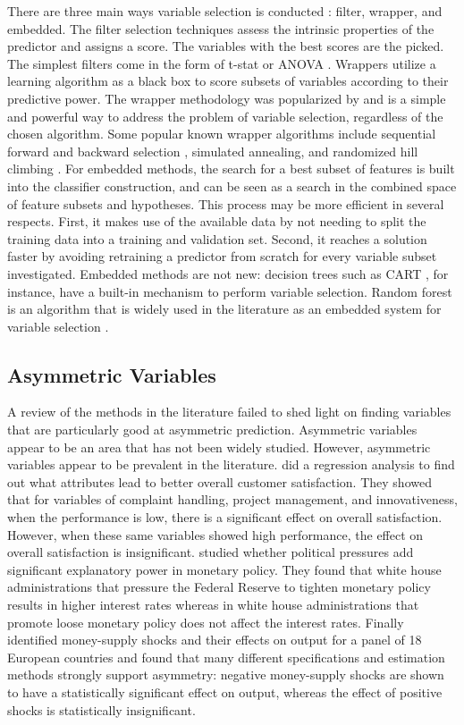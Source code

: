 \documentclass[twoside,11pt]{article}
\begin{document}
There are three main ways variable selection is conducted \citep{Saeys07}: filter, wrapper, and embedded. The filter selection techniques assess the intrinsic properties of the predictor and assigns a score. The variables with the best scores are the picked. The simplest filters come in the form of t-stat or ANOVA  \citep{Jafari06}. Wrappers utilize a learning algorithm as a black box to score subsets of variables according to their predictive power. The wrapper methodology was popularized by \citet{Kohavi96} and is a simple and powerful way to address the problem of variable selection, regardless of the chosen algorithm. Some popular known wrapper algorithms include sequential forward and backward selection \citep{Kittler78}, simulated annealing\citep{Kirkpatrick83}, and randomized hill climbing \citep{Skalak94}. For embedded methods, the search for a best subset of features is built into the classifier construction, and can be seen as a search in the combined space of feature subsets and hypotheses. This process may be more efficient in several respects. First, it makes use of the available data by not needing to split the training data into a training and validation set. Second, it reaches a solution faster by avoiding retraining a predictor from scratch for every variable subset investigated. Embedded methods are not new: decision trees such as CART \citep{Breiman84}, for instance, have a built-in mechanism to perform variable selection. Random forest is an algorithm that is widely used in the literature as an embedded system for variable selection \citep{Diaz06}\citep{Jiang04}.

\subsection{Asymmetric Variables}
A review of the methods in the literature failed to shed light on finding variables that are particularly good at asymmetric prediction. Asymmetric variables appear to be an area that has not been widely studied. However, asymmetric variables appear to be prevalent in the literature. \citet{Matzler04} did a regression analysis to find out what attributes lead to better overall customer satisfaction. They showed that for variables of complaint handling, project management, and innovativeness, when the performance is low, there is a significant effect on overall satisfaction. However, when these same variables showed high performance, the effect on overall satisfaction is insignificant. \citet{Froyen97} studied whether political pressures add significant explanatory power in monetary policy. They found that white house administrations that pressure the Federal Reserve to tighten monetary policy results in higher interest rates whereas in white house administrations that promote loose monetary policy does not affect the interest rates. Finally \citet{Karras97} identified money-supply shocks and their effects on output for a panel of 18 European countries and found that many different specifications and estimation methods strongly support asymmetry: negative money-supply shocks are shown to have a statistically significant effect on output, whereas the effect of positive shocks is statistically insignificant. 
\end{document}
